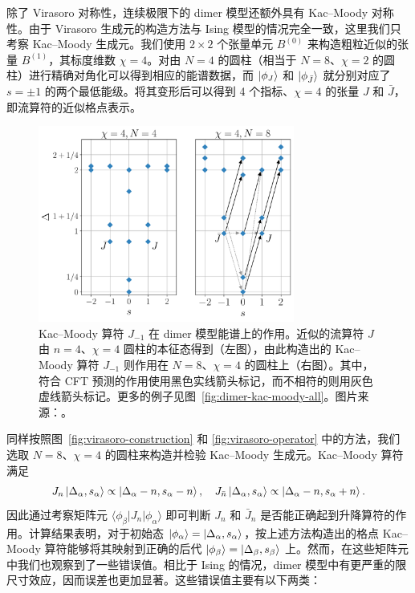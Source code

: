除了 Virasoro 对称性，连续极限下的 dimer 模型还额外具有 Kac--Moody 对称性。由于 Virasoro 生成元的构造方法与 Ising 模型的情况完全一致，这里我们只考察 Kac--Moody 生成元。我们使用 $2\times2$ 个张量单元 $B^{(0)}$ 来构造粗粒近似的张量 $B^{(1)}$，其标度维数 $\chi=4$。对由 $N=4$ 的圆柱（相当于 $N=8$、$\chi=2$ 的圆柱）进行精确对角化可以得到相应的能谱数据，而 $\ket*{\phi_J}$ 和 $\ket*{\phi_{\bar{J}}}$ 就分别对应了 $s=\pm1$ 的两个最低能级。将其变形后可以得到 4 个指标、$\chi=4$ 的张量 $J$ 和 $\bar{J}$，即流算符的近似格点表示。

\begin{figure}[ht]
  \centering
  \includegraphics[width=0.75\textwidth]{images/virasoro/dimer-spectrum.pdf}
  \caption[Kac--Moody 算符在 dimer 模型能谱上的作用]{Kac--Moody 算符 $J_{-1}$ 在 dimer 模型能谱上的作用。近似的流算符 $J$ 由 $n=4$、$\chi=4$ 圆柱的本征态得到（左图），由此构造出的 Kac--Moody 算符 $J_{-1}$ 则作用在 $N=8$、$\chi=4$ 的圆柱上（右图）。其中，符合 CFT 预测的作用使用黑色实线箭头标记，而不相符的则用灰色虚线箭头标记。更多的例子见图~\ref{fig:dimer-kac-moody-all}。图片来源：\parencite{wang2022virasoro}。}
  \label{fig:dimer-kac-moody}
\end{figure}

同样按照图~\ref{fig:virasoro-construction} 和 \ref{fig:virasoro-operator} 中的方法，我们选取 $N=8$、$\chi=4$ 的圆柱来构造并检验 Kac--Moody 生成元。Kac--Moody 算符满足
\begin{equation}
  J_n         \ket{\Delta_\alpha, s_\alpha} \propto \ket{\Delta_\alpha-n, s_\alpha-n}, \quad
  J_{\bar{n}} \ket{\Delta_\alpha, s_\alpha} \propto \ket{\Delta_\alpha-n, s_\alpha+n}.
\end{equation}
因此通过考察矩阵元 $\langle\phi_\beta|J_n|\phi_\alpha\rangle$ 即可判断 $J_n$ 和 $\bar{J}_n$ 是否能正确起到升降算符的作用。计算结果表明，对于初始态 $\ket{\phi_\alpha}=\ket{\Delta_\alpha,s_\alpha}$，按上述方法构造出的格点 Kac--Moody 算符能够将其映射到正确的后代 $\ket{\phi_\beta}=\ket{\Delta_\beta,s_\beta}$ 上。然而，在这些矩阵元中我们也观察到了一些错误值。相比于 Ising 的情况，dimer 模型中有更严重的限尺寸效应，因而误差也更加显著。这些错误值主要有以下两类：

